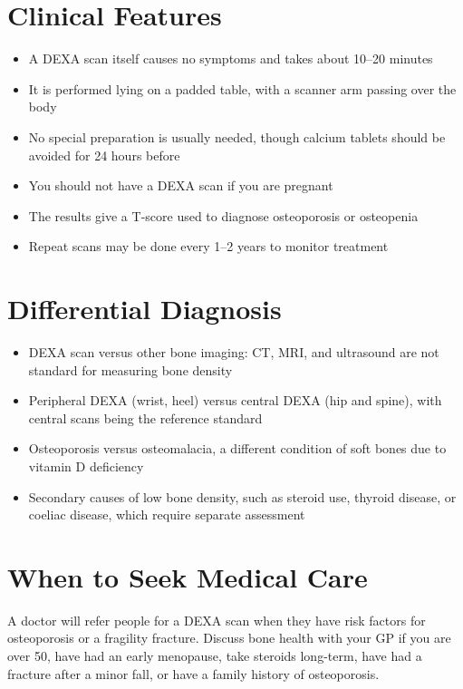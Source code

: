 \section*{Clinical Features}
\begin{itemize}
    \item A DEXA scan itself causes no symptoms and takes about 10--20 minutes
    \item It is performed lying on a padded table, with a scanner arm passing over the body
    \item No special preparation is usually needed, though calcium tablets should be avoided for 24 hours before
    \item You should not have a DEXA scan if you are pregnant
    \item The results give a T-score used to diagnose osteoporosis or osteopenia
    \item Repeat scans may be done every 1--2 years to monitor treatment
\end{itemize}

\section*{Differential Diagnosis}
\begin{itemize}
    \item DEXA scan versus other bone imaging: CT, MRI, and ultrasound are not standard for measuring bone density
    \item Peripheral DEXA (wrist, heel) versus central DEXA (hip and spine), with central scans being the reference standard
    \item Osteoporosis versus osteomalacia, a different condition of soft bones due to vitamin D deficiency
    \item Secondary causes of low bone density, such as steroid use, thyroid disease, or coeliac disease, which require separate assessment
\end{itemize}

\section*{When to Seek Medical Care}
A doctor will refer people for a DEXA scan when they have risk factors for osteoporosis or a fragility fracture. Discuss bone health with your GP if you are over 50, have had an early menopause, take steroids long-term, have had a fracture after a minor fall, or have a family history of osteoporosis.

